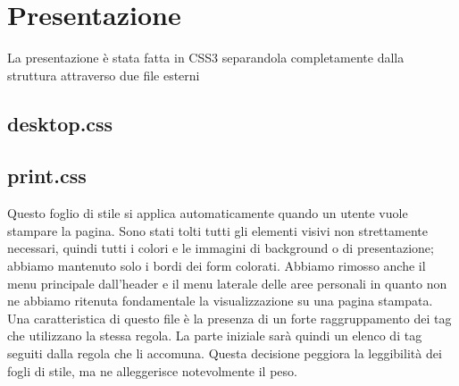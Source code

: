 \section{Presentazione}
	La presentazione è stata fatta in CSS3 separandola completamente dalla struttura attraverso due file esterni 
	\subsection{desktop.css}

	\subsection{print.css}
	Questo foglio di stile si applica automaticamente quando un utente vuole
stampare la pagina. Sono stati tolti tutti gli elementi visivi non strettamente necessari, quindi tutti i colori e le immagini di background o di presentazione; abbiamo mantenuto solo i bordi dei form colorati. Abbiamo rimosso anche il menu principale dall'header e il menu laterale delle aree personali in quanto non ne abbiamo ritenuta fondamentale la visualizzazione su una pagina stampata. Una caratteristica di questo file è la presenza di un forte raggruppamento dei tag che utilizzano la stessa regola. La parte iniziale sarà quindi un elenco di tag seguiti dalla regola che li accomuna. Questa decisione peggiora la leggibilità dei fogli di stile, ma ne alleggerisce notevolmente il peso.




